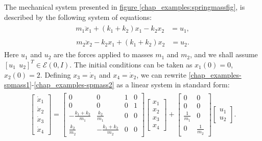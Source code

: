 \documentclass[letterpaper,10pt,english]{sphinxmanual}
\begin{document}
The mechanical system presented in \hyperref[chap_examples:springmassfig]{figure  \ref*{chap_examples:springmassfig}}, is described
by the following system of equations:
\label{chap_examples:equation-spmass1}\begin{gather}
\begin{split}m_1\ddot{x}_1+(k_1+k_2)x_1-k_2x_2 & = u_1,\end{split}\label{chap_examples-spmass1}
\end{gather}\label{chap_examples:equation-spmass2}\begin{gather}
\begin{split}m_2\ddot{x}_2-k_2x_1+(k_1+k_2)x_2 & = u_2 .\end{split}\label{chap_examples-spmass2}
\end{gather}
Here $u_1$ and $u_2$ are the forces applied to masses
$m_1$ and $m_2$, and we shall assume
$[u_1 ~~ u_2]^T\in{\mathcal E}(0,I)$. The initial conditions can
be taken as $x_1(0)=0$, $x_2(0)=2$. Defining
$x_3=\dot{x}_1$ and $x_4=\dot{x}_2$, we can rewrite
\eqref{chap_examples-spmass1}-\eqref{chap_examples-spmass2} as a linear system in standard form:
\label{chap_examples:equation-spmassls}\begin{gather}
\begin{split}\left[\begin{array}{c}
\dot{x}_1 \\
\dot{x}_2 \\
\dot{x}_3 \\
\dot{x}_4 \end{array}\right] = \left[\begin{array}{cccc}
0 & 0 & 1 & 0\\
0 & 0 & 0 & 1\\
-\frac{k_1+k_2}{m_1} & \frac{k_2}{m_1} & 0 & 0\\
\frac{k_2}{m_2} & -\frac{k_1+k_2}{m_2} & 0 & 0\end{array}\right]
\left[\begin{array}{c}
x_1 \\
x_2 \\
x_3 \\
x_4 \end{array}\right] + \left[\begin{array}{cc}
0 & 0\\
0 & 0\\
\frac{1}{m_1} & 0\\
0 & \frac{1}{m_2}\end{array}\right]\left[\begin{array}{c}
u_1\\
u_2\end{array}\right].\end{split}\label{chap_examples-spmassls}
\end{gather}
\end{document}
